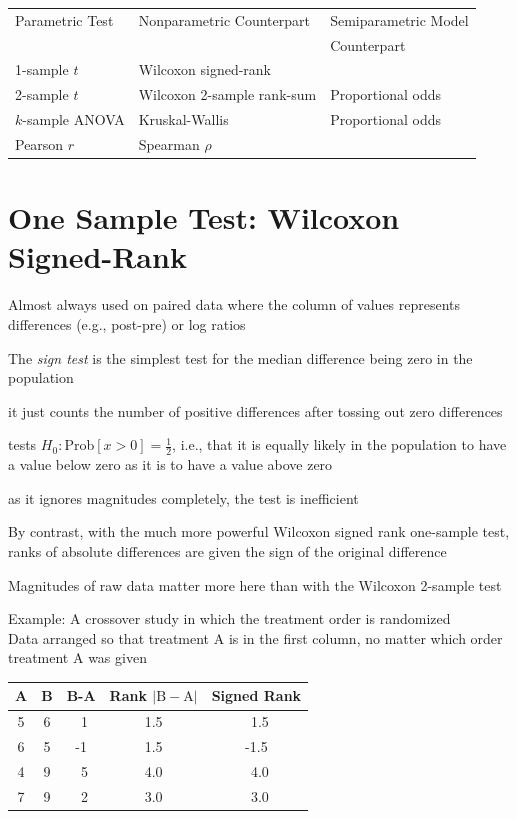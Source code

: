 \begin{center}
\begin{tabular}{lll} \hline
Parametric Test & Nonparametric Counterpart & Semiparametric Model \\
                &                           & Counterpart \\ \hline
1-sample $t$    & Wilcoxon signed-rank & \\
2-sample $t$    & Wilcoxon 2-sample rank-sum & Proportional odds \\
$k$-sample ANOVA           & Kruskal-Wallis  & Proportional odds \\
Pearson $r$     & Spearman $\rho$ & \\ \hline
\end{tabular}\end{center}
\ei

\section{One Sample Test: Wilcoxon Signed-Rank} 
\bi
\item Almost always used on paired data where the column of values
  represents differences (e.g., post-pre) or log ratios
\item The \emph{sign test} is the simplest test for the median
  difference being zero in the population
 \bi
 \item it just counts the number of positive differences after tossing
   out zero differences
 \item tests $H_{0}:$Prob$[x>0]=\frac{1}{2}$, i.e., that it is
   equally likely in the population to have a value below zero as it
   is to have a value above zero
 \item as it ignores magnitudes completely, the test is inefficient
 \ei
\item By contrast, with the much more powerful Wilcoxon signed rank one-sample test, ranks of absolute
  differences are given the sign of the original difference
\item Magnitudes of raw data matter more here than with the Wilcoxon
  2-sample test
\item Example: A crossover study in which the treatment order is  randomized \\
  Data arranged so that treatment A is in the first column, no matter which order treatment A was given


\begin{center}
\begin{tabular}{ccccc} \hline
A & B & B-A & Rank $|\mathrm{B-A}|$ & Signed Rank \\ \hline
5 & 6 & ~1 & 1.5 & ~1.5 \\
6 & 5 & -1 & 1.5 & -1.5 \\
4 & 9 & ~5 & 4.0 & ~4.0 \\
7 & 9 & ~2 & 3.0 & ~3.0 \\ \hline
\end{tabular}\end{center}

